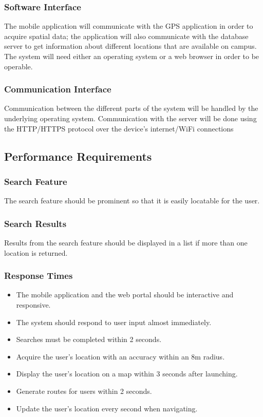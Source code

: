     \subsubsection{Software Interface}
    The mobile application will communicate with the GPS application in order to acquire spatial data; the application will also communicate with the database server to get information about different locations that are available on campus. The system will need either an operating system or a web browser in order to be operable.
        
    \subsubsection{Communication Interface}
    Communication between the different parts of the system will be handled by the underlying operating system. Communication with the server will be done using the HTTP/HTTPS protocol over the device's internet/WiFi connections

\subsection{Performance Requirements}
    \subsubsection{\textbf{Search Feature}}
        The search feature should be prominent so that it is easily locatable for the user.
     
    \subsubsection{\textbf{Search Results}}
        Results from the search feature should be displayed in a list if more than one location is returned.
    
    \subsubsection{\textbf{Response Times}}
        \begin{itemize}
            \item The mobile application and the web portal should be interactive and responsive.
            \item The system should respond to user input almost immediately.
            \item Searches must be completed within 2 seconds.
            \item Acquire the user's location with an accuracy within an 8m radius.
			\item Display the user's location on a map within 3 seconds after launching.
			\item Generate routes for users within 2 seconds.
			\item Update the user's location every second when navigating.
        \end{itemize}

